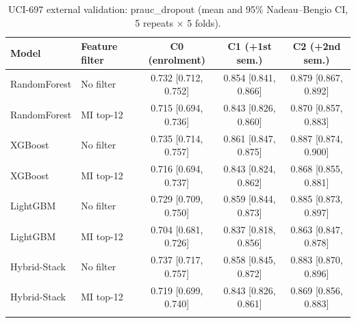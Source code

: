 \begin{table}[t]
\centering
\small
\caption{UCI-697 external validation: prauc\_dropout (mean and 95\% Nadeau--Bengio CI, 5 repeats $\times$ 5 folds).}
\label{tab:uci697_prauc_dropout}
\begin{tabular}{llccc}
\toprule
Model & Feature filter & C0 (enrolment) & C1 (+1st sem.) & C2 (+2nd sem.) \\
\midrule
RandomForest & No filter & 0.732 [0.712, 0.752] & 0.854 [0.841, 0.866] & 0.879 [0.867, 0.892] \\
RandomForest & MI top-12 & 0.715 [0.694, 0.736] & 0.843 [0.826, 0.860] & 0.870 [0.857, 0.883] \\
\addlinespace
XGBoost & No filter & 0.735 [0.714, 0.757] & 0.861 [0.847, 0.875] & 0.887 [0.874, 0.900] \\
XGBoost & MI top-12 & 0.716 [0.694, 0.737] & 0.843 [0.824, 0.862] & 0.868 [0.855, 0.881] \\
\addlinespace
LightGBM & No filter & 0.729 [0.709, 0.750] & 0.859 [0.844, 0.873] & 0.885 [0.873, 0.897] \\
LightGBM & MI top-12 & 0.704 [0.681, 0.726] & 0.837 [0.818, 0.856] & 0.863 [0.847, 0.878] \\
\addlinespace
Hybrid-Stack & No filter & 0.737 [0.717, 0.757] & 0.858 [0.845, 0.872] & 0.883 [0.870, 0.896] \\
Hybrid-Stack & MI top-12 & 0.719 [0.699, 0.740] & 0.843 [0.826, 0.861] & 0.869 [0.856, 0.883] \\
\addlinespace
\bottomrule
\end{tabular}
\end{table}